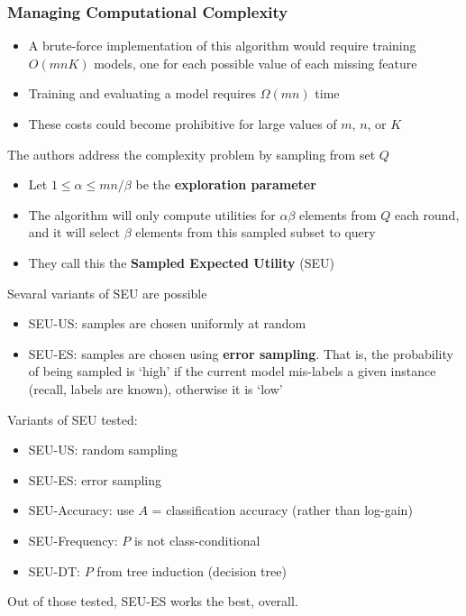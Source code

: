 \documentclass[10pt]{article}
\begin{document}
\subsubsection*{Managing Computational Complexity}
\begin{itemize}
	\item A brute-force implementation of this algorithm would require training $O(mnK)$ models, one for each possible value of each missing feature
	\item Training and evaluating a model requires $\Omega(mn)$ time
	\item These costs could become prohibitive for large values of $m$, $n$, or $K$
\end{itemize}
The authors address the complexity problem by sampling from set $Q$
\begin{itemize}
	\item Let $1 \leq \alpha \leq mn / \beta$ be the \textbf{exploration parameter}
	\item The algorithm will only compute utilities for $\alpha \beta$ elements from $Q$ each round, and it will select $\beta$ elements from this sampled subset to query
    \item They call this the \textbf{Sampled Expected Utility} (SEU)
\end{itemize}
Sevaral variants of SEU are possible
\begin{itemize}
	\item SEU-US: samples are chosen uniformly at random
	\item SEU-ES: samples are chosen using \textbf{error sampling}.  That is, the probability of being sampled is `high' if the current model mis-labels a given instance (recall, labels are known), otherwise it is `low'
\end{itemize}
Variants of SEU tested:
\begin{itemize}
	\item SEU-US: random sampling
	\item SEU-ES: error sampling
	\item SEU-Accuracy: use $A$ = classification accuracy (rather than log-gain)
	\item SEU-Frequency: $P$ is not class-conditional
	\item SEU-DT: $P$ from tree induction (decision tree)
\end{itemize}
Out of those tested, SEU-ES works the best, overall.
\end{document}
